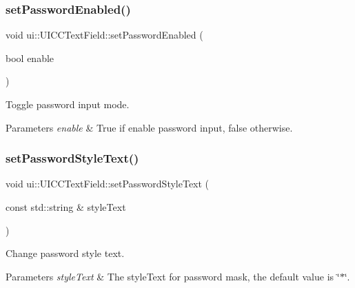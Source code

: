 \subsubsection{\texorpdfstring{set\+Password\+Enabled()}{setPasswordEnabled()}\hspace{0.1cm}{\footnotesize\ttfamily [2/2]}}
{\footnotesize\ttfamily void ui\+::\+U\+I\+C\+C\+Text\+Field\+::set\+Password\+Enabled (\begin{DoxyParamCaption}\item[{bool}]{enable }\end{DoxyParamCaption})}



Toggle password input mode. 


\begin{DoxyParams}{Parameters}
{\em enable} & True if enable password input, false otherwise. \\
\hline
\end{DoxyParams}
\mbox{\label{classui_1_1UICCTextField_a3fe6bde05e9a4b16abaf0eddf79f2ed6}} 
\subsubsection{\texorpdfstring{set\+Password\+Style\+Text()}{setPasswordStyleText()}\hspace{0.1cm}{\footnotesize\ttfamily [1/2]}}
{\footnotesize\ttfamily void ui\+::\+U\+I\+C\+C\+Text\+Field\+::set\+Password\+Style\+Text (\begin{DoxyParamCaption}\item[{const std\+::string \&}]{style\+Text }\end{DoxyParamCaption})}



Change password style text. 


\begin{DoxyParams}{Parameters}
{\em style\+Text} & The style\+Text for password mask, the default value is \char`\"{}$\ast$\char`\"{}. \\
\hline
\end{DoxyParams}
\mbox{\label{classui_1_1UICCTextField_a3fe6bde05e9a4b16abaf0eddf79f2ed6}} 
